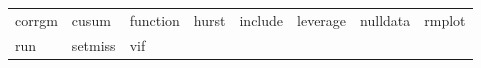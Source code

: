 \begin{tabular}{llllllll}
corrgm & cusum & function & hurst & include & leverage & nulldata & rmplot \\
run & setmiss & vif & \\
\end{tabular}

